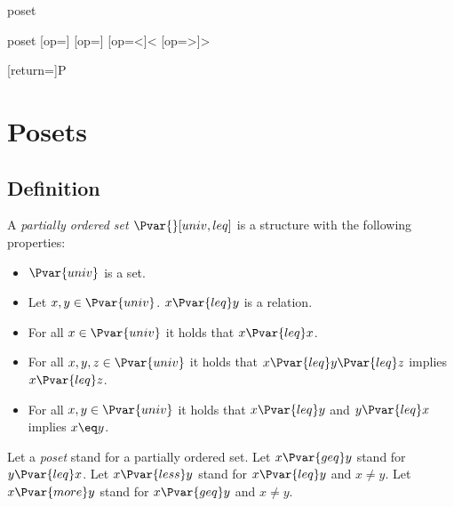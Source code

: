 \documentclass{stex}
\begin{document}
\begin{smodule}{poset}
\STEXexport{
  \let\oldleq\leq
  \let\leq\relax
  \let\oldgeq\geq
  \let\geq\relax
}

\begin{mathstructure}{poset}
  [op=\oldleq]{\;\oldleq\;}
  [op=\oldgeq]{\;\oldgeq\;}
  [op=<]{\;<\;}
  [op=>]{\;>\;}
\end{mathstructure}

[return={\poset[comp=##1]}]{\mathcal P}

\section{Posets}

\begin{forthel}     
\end{forthel}

\subsection{Definition}
  
\begin{signature*}[forthel,id=PosetSig,printid]
  A \emph{partially ordered set $\Pvar{}[univ,leq]$} is a structure with the following properties:

  \begin{itemize}
    \item \label{posetUnivSig}
      $\Pvar{univ}$ is a set.
    \item \label{posetLeqSig}
      Let $x, y \in \Pvar{univ}$. $x {\Pvar{leq}} y$ is a relation.
    \item \label{posetReflAx}
      For all $x \in \Pvar{univ}$ it holds that $x {\Pvar{leq}} x$.
    \item \label{posetTransAx}
      For all $x, y, z \in \Pvar{univ}$ it holds that $x {\Pvar{leq}} y {\Pvar{leq}} z$ implies $x {\Pvar{leq}} z$.
    \item \label{posetAntisymAx}
      For all $x, y \in \Pvar{univ}$ it holds that $x {\Pvar{leq}} y$ and $y {\Pvar{leq}} x$ implies $x\eq y$.
  \end{itemize}

  Let a \emph{poset} stand for a partially ordered set.
  Let $x {\Pvar{geq}} y$ stand for $y {\Pvar{leq}} x$.
  Let $x {\Pvar{less}} y$ stand for $x {\Pvar{leq}} y$ and $x\neq y$.
  Let $x {\Pvar{more}} y$ stand for $x {\Pvar{geq}} y$ and $x\neq y$.
\end{signature*}


\end{smodule}
\end{document}
